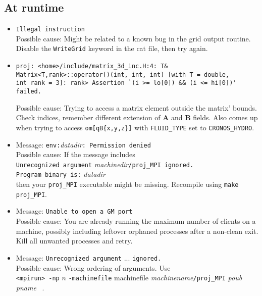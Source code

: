 \subsection{At runtime}
\begin{itemize}

\item {\tt Illegal instruction} \\
  Possible cause: Might be related to a known bug in the grid output routine.
  Disable the {\tt WriteGrid} keyword in the cat file, then try again.

\item 
\begin{verbatim}
proj: <home>/include/matrix_3d_inc.H:4: T&
Matrix<T,rank>::operator()(int, int, int) [with T = double,
int rank = 3]: rank> Assertion `(i >= lo[0]) && (i <= hi[0])'
failed.
\end{verbatim}
  Possible cause: Trying to access a matrix element outside the matrix'
  bounds. Check indices, remember different extension of {\bf A} and
  {\bf B} fields. Also comes up when trying to access
  \verb+om[qB{x,y,z}]+ with {\tt FLUID\_TYPE} set to {\tt CRONOS\_HYDRO}.

\item Message: {\tt env:}{\em datadir}{\tt:\ Permission denied} \\
  Possible cause:
  If the message includes \\
  {\tt Unrecognized argument} {\em machinedir}{\tt /proj\_MPI ignored.}\\
  {\tt Program binary is:} {\em datadir}\\
  then your {\tt  proj\_MPI} executable might be missing. Recompile using
  {\tt make proj\_MPI}.
\item Message: {\tt Unable to open a GM port} \\
  Possible cause:
  You are already running the maximum number of clients on a machine,
  possibly including leftover orphaned processes after a non-clean
  exit.  Kill all unwanted processes and retry.

\item Message: {\tt Unrecognized argument} ... {\tt ignored.} \\
  Possible cause: Wrong ordering of arguments. Use \\
  \verb+<mpirun> -np+ $n$ \verb+-machinefile+ machinefile
  {\em machinename}\verb+/proj_MPI+ {\em poub} {\em pname} \ .
  

\end{itemize}
